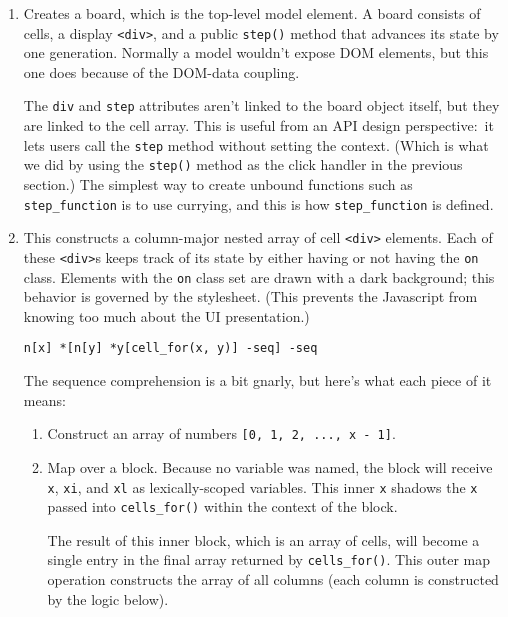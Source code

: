 \documentclass{report}
\begin{document}
\begin{enumerate}
\item[{\tt life\_board(x, y)}]
  Creates a board, which is the top-level model element. A board consists of cells, a display \verb|<div>|, and a public {\tt step()} method that advances its state by one generation.
  Normally a model wouldn't expose DOM elements, but this one does because of the DOM-data coupling.

  The {\tt div} and {\tt step} attributes aren't linked to the board object itself, but they are linked to the cell array. This is useful from an API design perspective:~it lets users
  call the {\tt step} method without setting the context. (Which is what we did by using the {\tt step()} method as the click handler in the previous section.) The simplest way to
  create unbound functions such as \verb|step_function| is to use currying, and this is how \verb|step_function| is defined.

\item[{\tt cells\_for(x, y)}]
  This constructs a column-major nested array of cell \verb|<div>| elements. Each of these \verb|<div>|s keeps track of its state by either having or not having the {\tt on} class.
  Elements with the {\tt on} class set are drawn with a dark background; this behavior is governed by the stylesheet. (This prevents the Javascript from knowing too much about the UI
  presentation.)

\begin{verbatim}
n[x] *[n[y] *y[cell_for(x, y)] -seq] -seq
\end{verbatim}

  The sequence comprehension is a bit gnarly, but here's what each piece of it means:

\begin{enumerate}
\item[{\tt n[x]}]
  Construct an array of numbers {\tt [0, 1, 2, ..., x - 1]}.

\item[{\tt *[...]}]
  Map over a block. Because no variable was named, the block will receive {\tt x}, {\tt xi}, and {\tt xl} as lexically-scoped variables. This inner {\tt x} shadows the {\tt x}
  passed into \verb|cells_for()| within the context of the block.

  The result of this inner block, which is an array of cells, will become a single entry in the final array returned by \verb|cells_for()|. This outer map operation constructs the
  array of all columns (each column is constructed by the logic below).


\end{enumerate}
\end{enumerate}
\end{document}
